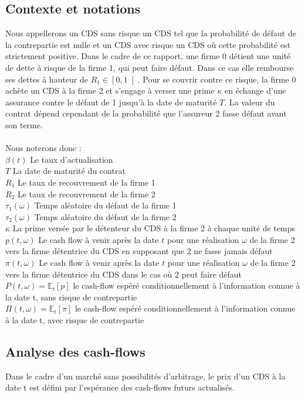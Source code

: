 \documentclass[a4paper]{article}
\begin{document}
\subsection{Contexte et notations}         %
Nous appellerons un CDS sans risque un CDS tel que la probabilité de défaut de la contrepartie est nulle et un CDS avec risque un CDS où cette probabilité est strictement positive.
 Dans le cadre de ce rapport, une firme 0 détient une unité de dette à risque de la firme 1, qui peut faire défaut.
 Dans ce cas elle rembourse ses dettes à hauteur de $R_{1} \in \left[ 0, 1 \right[$.
 Pour se couvrir contre ce risque, la firme 0 achète un CDS à la firme 2 et s'engage à verser une prime $\kappa$ en échange d'une assurance contre le défaut de 1 jusqu'à la date de maturité $T$.
 La valeur du contrat dépend cependant de la probabilité que l'assureur 2 fasse défaut avant son terme.
\\ \\
Nous noterons donc :\\
$\beta (t)$ Le taux d'actualisation\\
$T$ La date de maturité du contrat\\
$R_{1}$ Le taux de recouvrement de la firme 1\\
$R_{2}$ Le taux de recouvrement de la firme 2\\
$\tau_{1} (\omega)$ Temps aléatoire du défaut de la firme 1\\
$\tau_{2} (\omega)$ Temps aléatoire du défaut de la firme 2\\
$\kappa$ La prime versée par le détenteur du CDS à la firme 2 à chaque unité de temps\\
$p (t, \omega)$ Le cash flow à venir après la date $t$ pour une réalisation $\omega$ de la firme 2 vers la firme détentrice du CDS en supposant que 2 ne fasse jamais défaut\\
$\pi (t, \omega)$ Le cash flow à venir après la date $t$ pour une réalisation $\omega$ de la firme 2 vers la firme détentrice du CDS dans le cas où 2 peut faire défaut\\
$P (t, \omega) = \mathbb{E}_{t} [p]$ le cash-flow espéré conditionnellement à l'information connue à la date t, sans risque de contrepartie\\
$\Pi (t, \omega) = \mathbb{E}_{t} [\pi]$ le cash-flow espéré conditionnellement à l'information connue à la date t, avec risque de contrepartie


\subsection{Analyse des cash-flows}
Dans le cadre d'un marché sans possibilités d'arbitrage, le prix d'un CDS à la date t est défini par l'espérance des cash-flows futurs actualisés.
\end{document}
